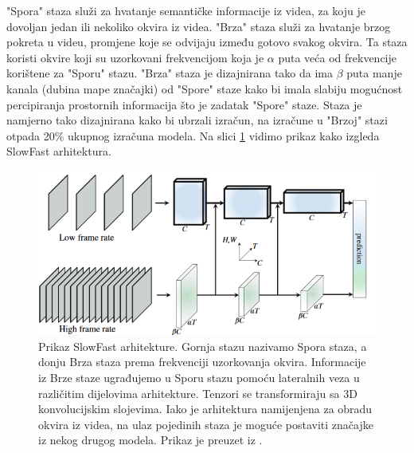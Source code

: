 \documentclass[times, utf8, diplomski,  numeric]{fer}
\begin{document}
\par
"Spora" staza služi za hvatanje semantičke informacije iz videa, za koju je dovoljan jedan ili nekoliko okvira iz videa. "Brza" staza služi za hvatanje brzog pokreta u videu, promjene koje se odvijaju između gotovo svakog okvira. Ta staza koristi okvire koji su uzorkovani frekvencijom koja je $\alpha$ puta veća od frekvencije korištene za "Sporu" stazu. "Brza" staza je dizajnirana tako da ima $\beta$ puta manje kanala (dubina mape značajki) od "Spore" staze kako bi imala slabiju mogućnost percipiranja prostornih informacija što je zadatak "Spore" staze. Staza je namjerno tako dizajnirana kako bi ubrzali izračun, na izračune u "Brzoj" stazi otpada 20\%  ukupnog izračuna modela. Na slici \ref{fig:slowfastdiag} vidimo prikaz kako izgleda SlowFast arhitektura.
\begin{figure}[htp]

\centering
\includegraphics[width=\textwidth]{./images/slow-fast-diag}\hfill

\caption{Prikaz SlowFast arhitekture. Gornja stazu nazivamo Spora staza, a donju Brza staza prema frekvenciji uzorkovanja okvira. Informacije iz Brze staze ugrađujemo u Sporu stazu pomoću lateralnih veza u različitim dijelovima arhitekture. Tenzori se transformiraju sa 3D konvolucijskim slojevima. Iako je arhitektura namijenjena za obradu okvira iz videa, na ulaz pojedinih staza je moguće postaviti značajke iz nekog drugog modela.  Prikaz je preuzet iz \cite{slow-fast}.}
\label{fig:slowfastdiag}
\end{figure}
\par
\end{document}
